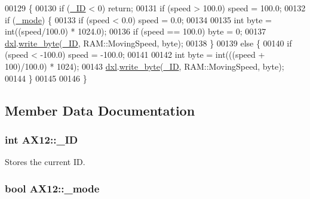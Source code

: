 \begin{DoxyCode}
00129 \{
00130     \textcolor{keywordflow}{if} (\hyperlink{class_a_x12_a0ae2b35fee3d120075e1d8f1e2055804}{\_ID} < 0) \textcolor{keywordflow}{return};
00131     \textcolor{keywordflow}{if} (speed > 100.0) speed = 100.0;
00132     \textcolor{keywordflow}{if} (\hyperlink{class_a_x12_a2fd07e2e636003227a32d09d211bd6d4}{\_mode}) \{
00133         \textcolor{keywordflow}{if} (speed < 0.0) speed = 0.0;
00134         
00135         \textcolor{keywordtype}{int} byte = int((speed/100.0) * 1024.0);
00136         \textcolor{keywordflow}{if} (speed == 100.0) byte = 0;
00137         \hyperlink{class_a_x12_a819a7760294ffa2022c5359155d6b51a}{dxl}.\hyperlink{classdynamixel_a66c1e32cc45dd46d329f1fc212e46a3d}{write\_byte}(\hyperlink{class_a_x12_a0ae2b35fee3d120075e1d8f1e2055804}{\_ID}, RAM::MovingSpeed, byte);        
00138     \}
00139     \textcolor{keywordflow}{else} \{
00140         \textcolor{keywordflow}{if} (speed < -100.0) speed = -100.0;   
00141         
00142         \textcolor{keywordtype}{int} byte = int(((speed + 100)/100.0) * 1024);
00143         \hyperlink{class_a_x12_a819a7760294ffa2022c5359155d6b51a}{dxl}.\hyperlink{classdynamixel_a66c1e32cc45dd46d329f1fc212e46a3d}{write\_byte}(\hyperlink{class_a_x12_a0ae2b35fee3d120075e1d8f1e2055804}{\_ID}, RAM::MovingSpeed, byte);
00144     \}
00145 
00146 \}
\end{DoxyCode}


\subsection{Member Data Documentation}
\hypertarget{class_a_x12_a0ae2b35fee3d120075e1d8f1e2055804}{}
\subsubsection[{\+\_\+\+I\+D}]{\setlength{\rightskip}{0pt plus 5cm}int A\+X12\+::\+\_\+\+I\+D\hspace{0.3cm}{\ttfamily [private]}}\label{class_a_x12_a0ae2b35fee3d120075e1d8f1e2055804}


Stores the current I\+D. 

\hypertarget{class_a_x12_a2fd07e2e636003227a32d09d211bd6d4}{}
\subsubsection[{\+\_\+mode}]{\setlength{\rightskip}{0pt plus 5cm}bool A\+X12\+::\+\_\+mode\hspace{0.3cm}{\ttfamily [private]}}\label{class_a_x12_a2fd07e2e636003227a32d09d211bd6d4}


